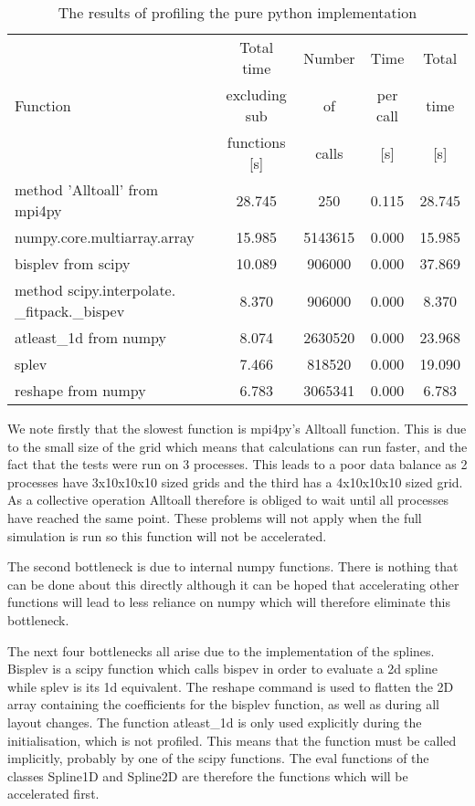 \begin{table}[ht]
 \begin{tabular}{|m{}|c|c|c|c|}
  \hline
          & Total time & Number & Time & Total \\
  Function & excluding sub & of & per call & time \\
          & functions [s] & calls & [s] & [s] \\
  \hline
  \hline
  method 'Alltoall' from mpi4py & 28.745 & 250 & 0.115 & 28.745 \\
  \hline
  numpy.core.multiarray.array & 15.985 & 5143615 & 0.000 & 15.985 \\
  \hline
  bisplev from scipy & 10.089 & 906000 & 0.000 & 37.869\\
  \hline
  method scipy.interpolate. \_fitpack.\_bispev & 8.370 & 906000 & 0.000 & 8.370\\
  \hline
  atleast\_1d from numpy & 8.074 & 2630520 & 0.000 & 23.968\\
  \hline
  splev & 7.466 & 818520 & 0.000 & 19.090\\
  \hline
  reshape from numpy & 6.783 & 3065341 & 0.000 & 6.783\\
  \hline
 \end{tabular}
\caption{\label{tab::pure python profile} The results of profiling the pure python implementation}
\end{table}

We note firstly that the slowest function is mpi4py’s Alltoall function. This is due to the small size of the grid which means that calculations can run faster, and the fact that the tests were run on 3 processes. This leads to a poor data balance as 2 processes have 3x10x10x10 sized grids and the third has a 4x10x10x10 sized grid. As a collective operation Alltoall therefore is obliged to wait until all processes have reached the same point. These problems will not apply when the full simulation is run so this function will not be accelerated. 

The second bottleneck is due to internal numpy functions. There is nothing that can be done about this directly although it can be hoped that accelerating other functions will lead to less reliance on numpy which will therefore eliminate this bottleneck.

The next four bottlenecks all arise due to the implementation of the splines. Bisplev is a scipy function which calls bispev in order to evaluate a 2d spline while splev is its 1d equivalent. The reshape command is used to flatten the 2D array containing the coefficients for the bisplev function, as well as during all layout changes. The function atleast\_1d  is  only used explicitly during the initialisation, which is not profiled. This means that the function must be called implicitly,  probably by one of the scipy functions. The eval functions of the classes Spline1D and Spline2D are therefore the functions which will be accelerated first.

